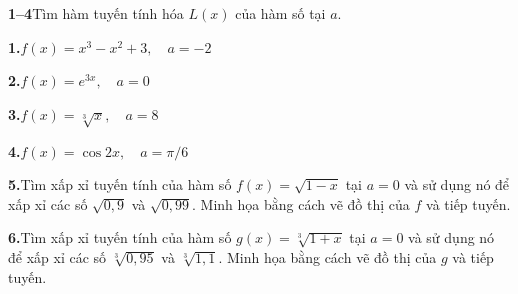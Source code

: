 \vspace{2.2em}

\noindent
{}

\vspace{1.2em}

\noindent
\begin{minipage}[t]{0.48\textwidth}
    \small
    \noindent\textbf{\textsf{\color{stewartcyan}1--4}}\quad Tìm hàm tuyến tính hóa $L(x)$ của hàm số tại $a$.

    \medskip
    \noindent\textbf{1.}\enspace $f(x) = x^3 - x^2 + 3,\quad a = -2$

    \medskip
    \noindent\textbf{2.}\enspace $f(x) = e^{3x},\quad a = 0$

    \medskip
    \noindent\textbf{3.}\enspace $f(x) = \sqrt[3]{x},\quad a = 8$

    \medskip
    \noindent\textbf{4.}\enspace $f(x) = \cos 2x,\quad a = \pi/6$

    \vspace{0.9em}
    \noindent{\color{stewartcyan!60}\rule{\linewidth}{0.5pt}}
\end{minipage}%
\hfill
\begin{minipage}[t]{0.48\textwidth}
    \small
    \noindent\graphcalc\enspace\textbf{5.}\enspace Tìm xấp xỉ tuyến tính của hàm số $f(x) = \sqrt{1-x}$ tại $a = 0$ và sử dụng nó để xấp xỉ các số $\sqrt{0{,}9}$ và $\sqrt{0{,}99}$. Minh họa bằng cách vẽ đồ thị của $f$ và tiếp tuyến.

    \medskip
    \noindent\graphcalc\enspace\textbf{6.}\enspace Tìm xấp xỉ tuyến tính của hàm số $g(x) = \sqrt[3]{1+x}$ tại $a = 0$ và sử dụng nó để xấp xỉ các số $\sqrt[3]{0{,}95}$ và $\sqrt[3]{1{,}1}$. Minh họa bằng cách vẽ đồ thị của $g$ và tiếp tuyến.
\end{minipage}

